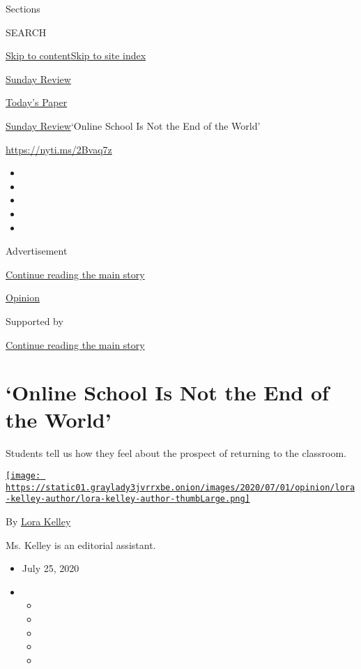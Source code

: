 Sections

SEARCH

\protect\hyperlink{site-content}{Skip to
content}\protect\hyperlink{site-index}{Skip to site index}

\href{https://www.nytimes3xbfgragh.onion/section/opinion/sunday}{Sunday
Review}

\href{https://myaccount.nytimes3xbfgragh.onion/auth/login?response_type=cookie\&client_id=vi}{}

\href{https://www.nytimes3xbfgragh.onion/section/todayspaper}{Today's
Paper}

\href{/section/opinion/sunday}{Sunday Review}\textbar{}`Online School Is
Not the End of the World'

\url{https://nyti.ms/2Bvaq7z}

\begin{itemize}
\item
\item
\item
\item
\item
\end{itemize}

Advertisement

\protect\hyperlink{after-top}{Continue reading the main story}

\href{/section/opinion}{Opinion}

Supported by

\protect\hyperlink{after-sponsor}{Continue reading the main story}

\hypertarget{online-school-is-not-the-end-of-the-world}{%
\section{`Online School Is Not the End of the
World'}\label{online-school-is-not-the-end-of-the-world}}

Students tell us how they feel about the prospect of returning to the
classroom.

\href{https://www.nytimes3xbfgragh.onion/by/lora-kelley}{\texttt{[image: https://static01.graylady3jvrrxbe.onion/images/2020/07/01/opinion/lora-kelley-author/lora-kelley-author-thumbLarge.png]}}

By \href{https://www.nytimes3xbfgragh.onion/by/lora-kelley}{Lora Kelley}

Ms. Kelley is an editorial assistant.

\begin{itemize}
\item
  July 25, 2020
\item
  \begin{itemize}
  \item
  \item
  \item
  \item
  \item
  \end{itemize}
\end{itemize}


